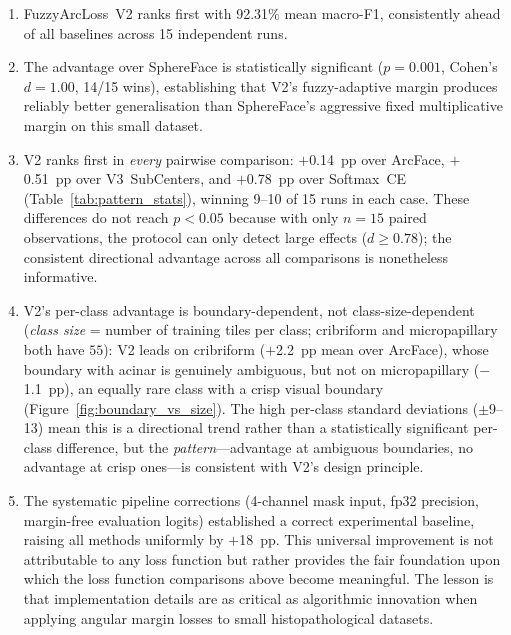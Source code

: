 \begin{enumerate}
    \item FuzzyArcLoss~V2 ranks first with 92.31\% mean macro-F1,
    consistently ahead of all baselines across 15 independent runs.

    \item The advantage over SphereFace is statistically significant
    ($p = 0.001$, Cohen's $d = 1.00$, 14/15 wins), establishing that
    V2's fuzzy-adaptive margin produces reliably better generalisation
    than SphereFace's aggressive fixed multiplicative margin on this
    small dataset.

    \item V2 ranks first in \emph{every} pairwise comparison: $+$0.14~pp
    over ArcFace, $+$0.51~pp over V3~SubCenters, and $+$0.78~pp over
    Softmax~CE (Table~\ref{tab:pattern_stats}), winning 9--10 of 15 runs
    in each case.
    These differences do not reach $p < 0.05$ because with only
    $n = 15$ paired observations, the protocol can only detect large
    effects ($d \geq 0.78$); the consistent directional advantage
    across all comparisons is nonetheless informative.

    \item V2's per-class advantage is boundary-dependent, not
    class-size-dependent (\emph{class size} = number of training
    tiles per class; cribriform and micropapillary both have $55$):
    V2 leads on cribriform ($+$2.2~pp mean over ArcFace), whose
    boundary with acinar is genuinely ambiguous, but not on
    micropapillary ($-$1.1~pp), an equally rare class with a
    crisp visual boundary
    (Figure~\ref{fig:boundary_vs_size}).
    The high per-class standard deviations ($\pm$9--13) mean this is a
    directional trend rather than a statistically significant per-class
    difference, but the \emph{pattern}---advantage at ambiguous
    boundaries, no advantage at crisp ones---is consistent with V2's
    design principle.

    \item The systematic pipeline corrections (4-channel mask input,
    fp32 precision, margin-free evaluation logits) established a correct
    experimental baseline, raising all methods uniformly by $+$18~pp.
    This universal improvement is not attributable to any loss function
    but rather provides the fair foundation upon which the loss function
    comparisons above become meaningful.
    The lesson is that implementation details are as critical as
    algorithmic innovation when applying angular margin losses to small
    histopathological datasets.
\end{enumerate}


